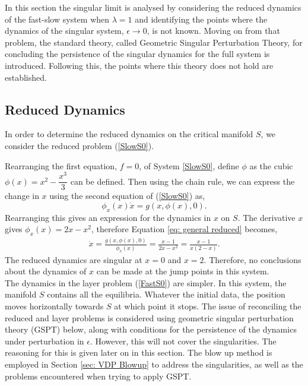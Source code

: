 In this section the singular limit is analysed by considering the reduced dynamics of the fast-slow system when $\lambda=1$ and identifying the points where the dynamics of the singular system, $\epsilon \to 0$, is not known. Moving on from that problem, the standard theory, called Geometric Singular Perturbation Theory, for concluding the persistence of the singular dynamics for the full system is introduced. Following this, the points where this theory does not hold are established.

\subsection{Reduced Dynamics}
In order to determine the reduced dynamics on the critical manifold $S$, we consider the reduced problem (\ref{SlowS0}). 

Rearranging the first equation, $f=0$, of System \ref{SlowS0}, define $\phi$ as the cubic $ \phi(x) = x^2-\dfrac{x^3}{3}$ can be defined. Then using the chain rule, we can express the change in $x$ using the second equation of (\ref{SlowS0}) as,
\begin{equation}
\phi_x(x)\dot{x}=g(x,\phi(x),0).
\label{eq: general reduced}
\end{equation}
Rearranging this gives an expression for the dynamics in $x$ on $S$.
The derivative \wrt $x$ gives $\phi_x(x)=2x-x^2$, therefore Equation \ref{eq: general reduced} becomes, 
\begin{align*}
\dot{x} = \frac{g(x,\phi(x),0)}{ \phi_x(x)} = \frac{ x-1}{2x-x^2} =\frac{ x-1}{x(2-x)}.
\end{align*}
The reduced dynamics are singular at $x=0$ and $x=2$. Therefore, no conclusions about the dynamics of $x$ can be made at the jump points in this system. \\ 

The dynamics in the layer problem (\ref{FastS0}) are simpler. In this system, the manifold $S$ contains all the equilibria. Whatever the initial data, the position moves horizontally towards $S$ at which point it stops. The issue of reconciling the reduced and layer problems is considered using geometric singular perturbation theory (GSPT) below, along with conditions for the persistence of the dynamics under perturbation in $\epsilon$. However, this will not cover the singularities. The reasoning for this is given later on in this section. The blow up method is employed in Section \ref{sec: VDP Blowup} to address the singularities, as well as the problems encountered when trying to apply GSPT. 

